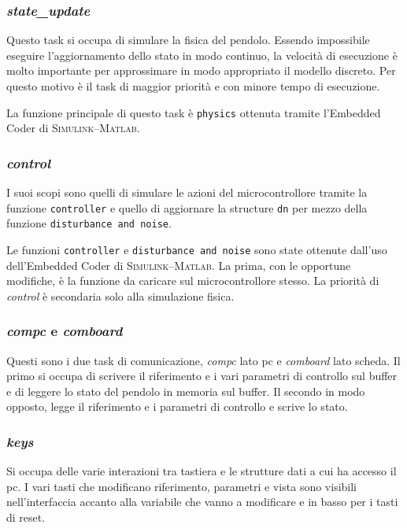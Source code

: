\subsubsection{\textit{state\_update}}
Questo task si occupa di simulare la fisica del pendolo. Essendo impossibile eseguire l'aggiornamento dello stato in modo continuo, la velocit\`a di esecuzione \`e molto importante per approssimare in modo appropriato il modello discreto. Per questo motivo \`e il task di maggior priorit\`a e con minore tempo di esecuzione.

La funzione principale di questo task \`e \texttt{physics} ottenuta tramite l'Embedded Coder di \textsc{Simulink--Matlab}.

\subsubsection{\textit{control}}
I suoi scopi sono quelli di simulare le azioni del microcontrollore tramite la funzione \texttt{controller} e quello di aggiornare la structure \texttt{dn} per mezzo della funzione \texttt{disturbance and noise}. 

Le funzioni \texttt{controller} e \texttt{disturbance and noise} sono state ottenute dall'uso dell'Em\-bed\-ded Coder di \textsc{Simulink--Matlab}. La prima, con le opportune modifiche, \`e la funzione da caricare sul microcontrollore stesso. La priorit\`a di \textit{control} \`e secondaria solo alla simulazione fisica.

\subsubsection{\textit{compc} e \textit{comboard}}
Questi sono i due task di comunicazione, \textit{compc} lato pc e \textit{comboard} lato scheda. Il primo si occupa di scrivere il riferimento e i vari parametri di controllo sul buffer e di leggere lo stato del pendolo in memoria sul buffer. Il secondo in modo opposto, legge il riferimento e i parametri di controllo e scrive lo stato.

\subsubsection{\textit{keys}}
Si occupa delle varie interazioni tra tastiera e le strutture dati a cui ha accesso il pc. I vari tasti che modificano riferimento, parametri e vista sono visibili nell'interfaccia accanto alla variabile che vanno a modificare e in basso per i tasti di reset.

